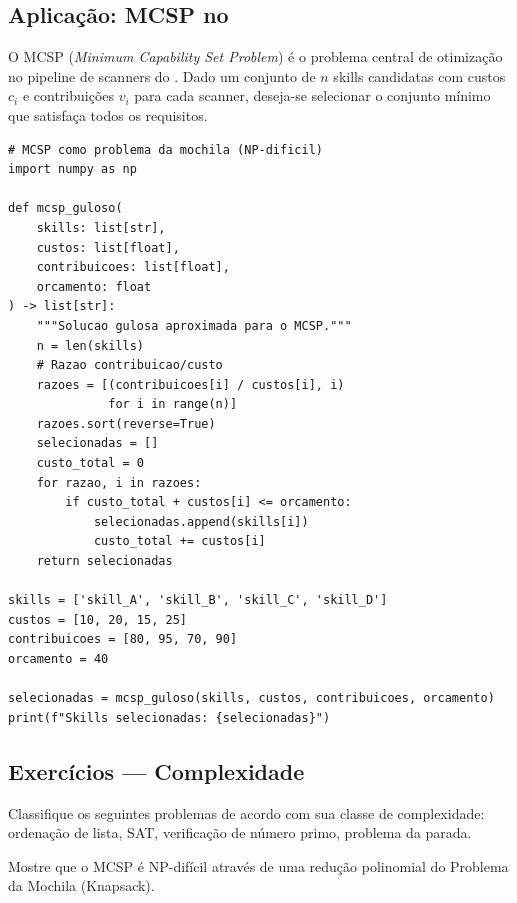 \subsection{Aplicação: MCSP no \opencodeeco{}}

O MCSP (\textit{Minimum Capability Set Problem}) é o problema central de
otimização no pipeline de scanners do \opencodeeco{} \cite{opencode2026scanner,
opencode2026spec036}. Dado um conjunto de $n$ skills candidatas com custos
$c_i$ e contribuições $v_i$ para cada scanner, deseja-se selecionar o
conjunto mínimo que satisfaça todos os requisitos.

\begin{lstlisting}[style=pythonstyle]
# MCSP como problema da mochila (NP-dificil)
import numpy as np

def mcsp_guloso(
    skills: list[str],
    custos: list[float],
    contribuicoes: list[float],
    orcamento: float
) -> list[str]:
    """Solucao gulosa aproximada para o MCSP."""
    n = len(skills)
    # Razao contribuicao/custo
    razoes = [(contribuicoes[i] / custos[i], i)
              for i in range(n)]
    razoes.sort(reverse=True)
    selecionadas = []
    custo_total = 0
    for razao, i in razoes:
        if custo_total + custos[i] <= orcamento:
            selecionadas.append(skills[i])
            custo_total += custos[i]
    return selecionadas

skills = ['skill_A', 'skill_B', 'skill_C', 'skill_D']
custos = [10, 20, 15, 25]
contribuicoes = [80, 95, 70, 90]
orcamento = 40

selecionadas = mcsp_guloso(skills, custos, contribuicoes, orcamento)
print(f"Skills selecionadas: {selecionadas}")
\end{lstlisting}

\subsection{Exercícios — Complexidade}

\begin{exercicio}
    Classifique os seguintes problemas de acordo com sua classe de
    complexidade: ordenação de lista, SAT, verificação de número primo,
    problema da parada.
\end{exercicio}

\begin{exercicio}
    Mostre que o MCSP é NP-difícil através de uma redução polinomial do
    Problema da Mochila (Knapsack).
\end{exercicio}


